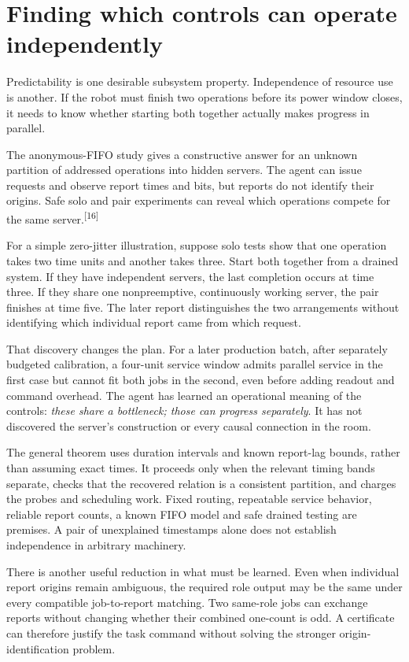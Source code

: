 \documentclass[11pt]{article}
\newcommand{\sn}[1]{\textsuperscript{[#1]}}
\begin{document}
\section{Finding which controls can operate independently}

Predictability is one desirable subsystem property. Independence of resource use is another. If the robot must finish two operations before its power window closes, it needs to know whether starting both together actually makes progress in parallel.

The anonymous-FIFO study gives a constructive answer for an unknown partition of addressed operations into hidden servers. The agent can issue requests and observe report times and bits, but reports do not identify their origins. Safe solo and pair experiments can reveal which operations compete for the same server.\sn{16}

For a simple zero-jitter illustration, suppose solo tests show that one operation takes two time units and another takes three. Start both together from a drained system. If they have independent servers, the last completion occurs at time three. If they share one nonpreemptive, continuously working server, the pair finishes at time five. The later report distinguishes the two arrangements without identifying which individual report came from which request.

That discovery changes the plan. For a later production batch, after separately budgeted calibration, a four-unit service window admits parallel service in the first case but cannot fit both jobs in the second, even before adding readout and command overhead. The agent has learned an operational meaning of the controls: \emph{these share a bottleneck; those can progress separately}. It has not discovered the server's construction or every causal connection in the room.

The general theorem uses duration intervals and known report-lag bounds, rather than assuming exact times. It proceeds only when the relevant timing bands separate, checks that the recovered relation is a consistent partition, and charges the probes and scheduling work. Fixed routing, repeatable service behavior, reliable report counts, a known FIFO model and safe drained testing are premises. A pair of unexplained timestamps alone does not establish independence in arbitrary machinery.

There is another useful reduction in what must be learned. Even when individual report origins remain ambiguous, the required role output may be the same under every compatible job-to-report matching. Two same-role jobs can exchange reports without changing whether their combined one-count is odd. A certificate can therefore justify the task command without solving the stronger origin-identification problem.
\end{document}

